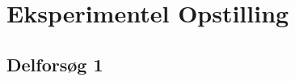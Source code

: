 \documentclass[main]{subfiles}
\begin{document}
\section{Eksperimentel Opstilling}
\subsection{Delforsøg 1}
\end{document}
